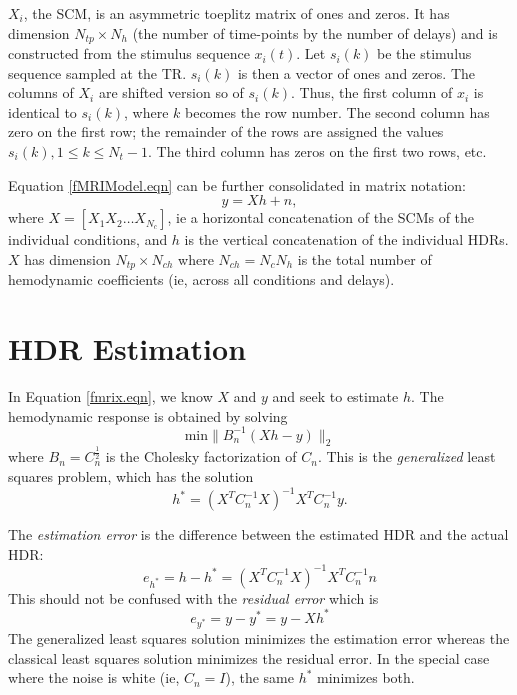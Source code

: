 \documentclass[12pt]{article}
\begin{document}
$X_i$, the SCM, is an asymmetric toeplitz matrix of ones and zeros. It
has dimension $N_{tp} \times N_h$ (the number of time-points by the
number of delays) and is constructed from the stimulus sequence
$x_i(t)$.  Let $s_i(k)$ be the stimulus sequence sampled at the TR.
$s_i(k)$ is then a vector of ones and zeros.  The columns of $X_i$ are
shifted version so of $s_i(k)$. Thus, the first column of $x_i$ is
identical to $s_i(k)$, where $k$ becomes the row number.  The second
column has zero on the first row; the remainder of the rows are
assigned the values $s_i(k), 1 \le k \le N_t-1$.  The third column has
zeros on the first two rows, etc.  

Equation \ref{fMRIModel.eqn} can be further consolidated in matrix
notation:
\begin{equation}
y = X h + n,
\label{fmrix.eqn}
\end{equation}
where $X = [X_1 X_2 \ldots X_{N_c}]$, ie a horizontal concatenation
of the SCMs of the individual conditions, and $h$ is the vertical
concatenation of the individual HDRs.  $X$ has dimension $N_{tp}
\times  N_{ch}$ where $N_{ch} = N_c N_h$ is the total number of 
hemodynamic coefficients (ie, across all conditions and delays).

\section{HDR Estimation}

In Equation \ref{fmrix.eqn}, we know $X$ and $y$ and seek to estimate
$h$.  The hemodynamic response is obtained by solving
\begin{equation}
\text{min} \parallel B^{-1}_n (X h - y) \parallel_2
\end{equation}
where $B_n = C_n^\frac{1}{2}$ is the Cholesky factorization of $C_n$.
This is the {\em generalized} least squares problem, which has the
solution
\begin{equation}
h^* = (X^T C_n^{-1} X)^{-1} X^T C_n^{-1} y.
\label{hstar.eqn}
\end{equation}

The {\em estimation error} is the difference between the estimated HDR
and the actual HDR:
\begin{equation}
e_{h^*} = h - h^* = (X^T C_n^{-1} X)^{-1} X^T C_n^{-1} n
\label{esterr.eqn}
\end{equation}
This should not be confused with the {\em residual error} which is
\begin{equation}
e_{y^*} = y - y^* = y - X h^*
\label{resstar.eqn}
\end{equation}
The generalized least squares solution minimizes the estimation error
whereas the classical least squares solution minimizes the residual
error.  In the special case where the noise is white (ie, $C_n = I$),
the same $h^*$ minimizes both.
\end{document}
